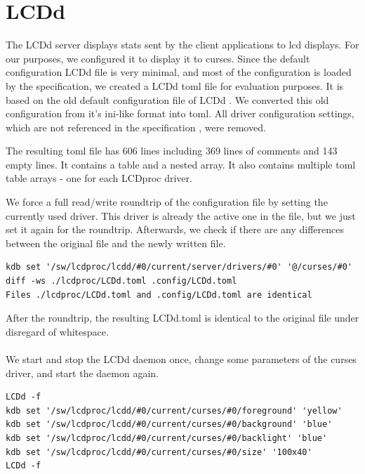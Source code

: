 \documentclass[draft,final]{vutinfth} %
\begin{document}
\section{LCDd}
The LCDd server displays stats sent by the client applications to \acrshort{lcd} displays.
For our purposes, we configured it to display it to curses.
Since the default configuration LCDd file is very minimal, and most of the configuration is loaded by the specification, we created a LCDd \acrshort{toml} file for evaluation purposes.
It is based on the old default configuration file of LCDd \cite{LCDprocconf}.
We converted this old configuration from it's ini-like format into \acrshort{toml}.
All driver configuration settings, which are not referenced in the specification \cite{bauhausforklcdprocslcddspec}, were removed.

The resulting \acrshort{toml} file has 606 lines including 369 lines of comments and 143 empty lines.
It contains a table and a nested array.
It also contains multiple \acrshort{toml} table arrays - one for each LCDproc driver.

We force a full read/write roundtrip of the configuration file by setting the currently used driver. This driver is already the active one in the file, but we just set it again for the roundtrip.
Afterwards, we check if there are any differences between the original file and the newly written file.

\begin{Verbatim}[frame=single, fontsize=\small]
kdb set '/sw/lcdproc/lcdd/#0/current/server/drivers/#0' '@/curses/#0'
diff -ws ./lcdproc/LCDd.toml .config/LCDd.toml
Files ./lcdproc/LCDd.toml and .config/LCDd.toml are identical
\end{Verbatim}

After the roundtrip, the resulting LCDd.toml is identical to the original file under disregard of whitespace.
\\\\
We start and stop the LCDd daemon once, change some parameters of the curses driver, and start the daemon again.
\begin{Verbatim}[frame=single, fontsize=\small]
LCDd -f
kdb set '/sw/lcdproc/lcdd/#0/current/curses/#0/foreground' 'yellow'
kdb set '/sw/lcdproc/lcdd/#0/current/curses/#0/background' 'blue'
kdb set '/sw/lcdproc/lcdd/#0/current/curses/#0/backlight' 'blue'
kdb set '/sw/lcdproc/lcdd/#0/current/curses/#0/size' '100x40'
LCDd -f
\end{Verbatim}
\end{document}
